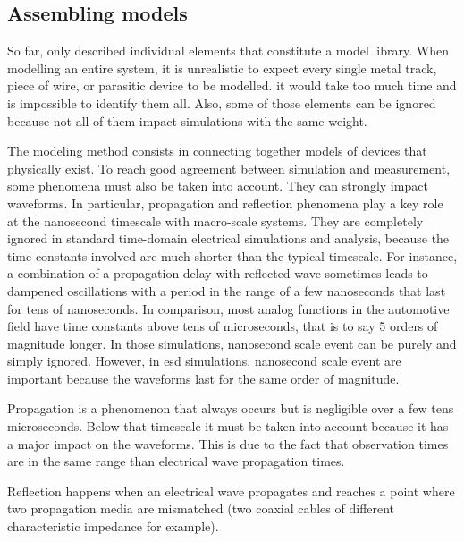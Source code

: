 \subsection{Assembling models}

So far, only described individual elements that constitute a model library.
When modelling an entire system, it is unrealistic to expect every single metal track, piece of wire, or parasitic device to be modelled.
it would take too much time and is impossible to identify them all.
Also, some of those elements can be ignored because not all of them impact simulations with the same weight.

%

The modeling method consists in connecting together models of devices that physically exist.
To reach good agreement between simulation and measurement, some phenomena must also be taken into account.
They can strongly impact waveforms.
In particular, propagation and reflection phenomena play a key role at the nanosecond timescale with macro-scale systems.
They are completely ignored in standard time-domain electrical simulations and analysis, because the time constants involved are much shorter than the typical timescale.
For instance, a combination of a propagation delay with reflected wave sometimes leads to dampened oscillations with a period in the range of a few nanoseconds that last for tens of nanoseconds.
In comparison, most analog functions in the automotive field have time constants above tens of microseconds, that is to say 5 orders of magnitude longer.
In those simulations, nanosecond scale event can be purely and simply ignored.
However, in \gls{esd} simulations, nanosecond scale event are important because the waveforms last for the same order of magnitude.

Propagation is a phenomenon that always occurs but is negligible over a few tens microseconds.
Below that timescale it must be taken into account because it has a major impact on the waveforms.
This is due to the fact that observation times are in the same range than electrical wave propagation times.

Reflection happens when an electrical wave propagates and reaches a point where two propagation media are mismatched (two coaxial cables of different characteristic impedance for example).

